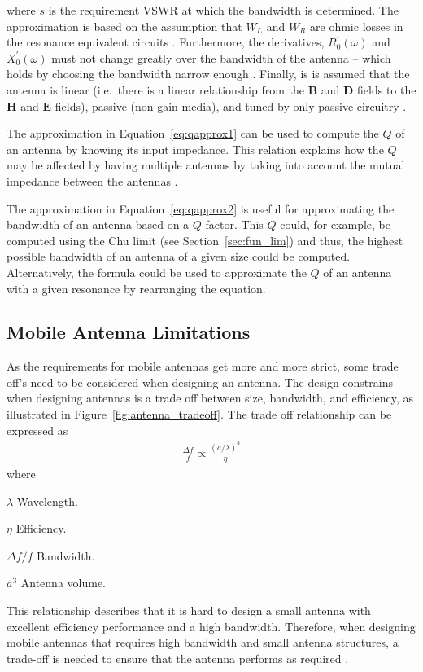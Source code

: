 where $s$ is the requirement VSWR at which the bandwidth is determined. The approximation is based on the assumption that $W_L$ and $W_R$ are ohmic losses in the resonance equivalent circuits \cite{yaghjian2005impedance}. Furthermore, the derivatives, $R^{\prime}_0(\omega)$ and $X^{\prime}_0(\omega)$ must not change greatly over the bandwidth of the antenna -- which holds by choosing the bandwidth narrow enough \cite{yaghjian2005impedance}.
Finally, is is assumed that the antenna is linear (i.e.\ there is a linear relationship from the $\mathbf{B}$ and $\mathbf{D}$ fields to the $\mathbf{H}$ and $\mathbf{E}$ fields), passive (non-gain media), and tuned by only passive circuitry \cite{yaghjian2005impedance}. 

The approximation in Equation~\ref{eq:qapprox1} can be used to compute the $Q$ of an antenna by knowing its input impedance. This relation explains how the $Q$ may be affected by having multiple antennas by taking into account the mutual impedance between the antennas \cite{balanis2012antenna}.

The approximation in Equation~\ref{eq:qapprox2} is useful for approximating the bandwidth of an antenna based on a $Q$-factor. This $Q$ could, for example, be computed using the Chu limit (see Section~\ref{sec:fun_lim}) and thus, the highest possible bandwidth of an antenna of a given size could be computed. Alternatively, the formula could be used to approximate the $Q$ of an antenna with a given resonance by rearranging the equation.

\FloatBarrier
\subsection{Mobile Antenna Limitations}
\label{subsec:ant_limit}
As the requirements for mobile antennas get more and more strict, some trade off's need to be considered when designing an antenna.
The design constrains when designing antennas is a trade off between size, bandwidth, and efficiency, as illustrated in Figure~\ref{fig:antenna_tradeoff}. 
The trade off relationship can be expressed as \cite{hilbert2015tradeoff}
\begin{align} %
  \frac{\Delta f}{f} \propto \frac{(a/ \lambda)^3}{\eta}
\end{align}
where
\begin{where}
\item [$\lambda$] Wavelength.
\item [$\eta$] Efficiency.
\item [$\Delta f / f$] Bandwidth.
\item [$a^3$] Antenna volume.
\end{where}
This relationship describes that it is hard to design a small antenna with excellent efficiency performance and a high bandwidth.
Therefore, when designing mobile antennas that requires high bandwidth and small antenna structures, a trade-off is needed to ensure that the antenna performs as required \cite{hilbert2015tradeoff}.

